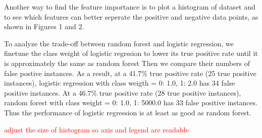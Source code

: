 \documentclass{soups}
\begin{document}
Another way to find the feature importance is to plot a histogram of dataset and to see which features can better seperate the positive and negative data points, as shown in Figures 1 and 2.

To analyze the trade-off between random forest and logistic regression, we finetune the class weight of logistic regrssion to lower its true positive rate until it is approximately the same as random forest Then we compare their numbers of false postive instances. As a result, at a 41.7\% true positive rate (25 true positive instances), logistic regression with class weigth = {0: 1.0, 1: 2.0} has 34 false positive instances. At a 46.7\% true positive rate (28 true positive instances), random forest with class weight = {0: 1.0, 1: 5000.0} has 33 false positive instances. Thus the performance of logistic regression is at least as good as random forest.


\textcolor{red}{adjust the size of histogram so axis and legend are readable}
\end{document}
